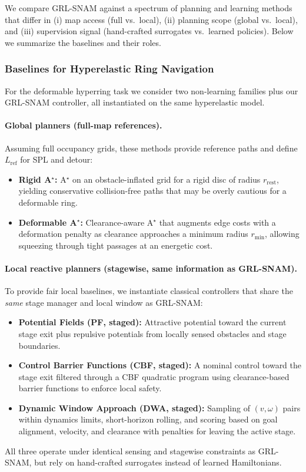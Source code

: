 \documentclass{article} %
\begin{document}
We compare GRL-SNAM against a spectrum of planning and learning methods that differ in (i) map access (full vs.\ local), (ii) planning scope (global vs.\ local), and (iii) supervision signal (hand-crafted surrogates vs.\ learned policies). Below we summarize the baselines and their roles.

\subsubsection{Baselines for Hyperelastic Ring Navigation}
\label{subsubsec:baselines_ring}

For the deformable hyperring task we consider two non-learning families plus our GRL-SNAM controller, all instantiated on the same hyperelastic model.

\paragraph{Global planners (full-map references).}
Assuming full occupancy grids, these methods provide reference paths and define $L_{\mathrm{ref}}$ for SPL and detour:
\begin{itemize}
    \item \textbf{Rigid A$^{\star}$:} A$^{\star}$ on an obstacle-inflated grid for a rigid disc of radius $r_{\text{rest}}$, yielding conservative collision-free paths that may be overly cautious for a deformable ring.
    \item \textbf{Deformable A$^{\star}$:} Clearance-aware A$^{\star}$ that augments edge costs with a deformation penalty as clearance approaches a minimum radius $r_{\min}$, allowing squeezing through tight passages at an energetic cost.
\end{itemize}

\paragraph{Local reactive planners (stagewise, same information as GRL-SNAM).}
To provide fair local baselines, we instantiate classical controllers that share the \emph{same} stage manager and local window as GRL-SNAM:
\begin{itemize}
    \item \textbf{Potential Fields (PF, staged):} Attractive potential toward the current stage exit plus repulsive potentials from locally sensed obstacles and stage boundaries.
    \item \textbf{Control Barrier Functions (CBF, staged):} A nominal control toward the stage exit filtered through a CBF quadratic program using clearance-based barrier functions to enforce local safety.
    \item \textbf{Dynamic Window Approach (DWA, staged):} Sampling of $(v,\omega)$ pairs within dynamics limits, short-horizon rolling, and scoring based on goal alignment, velocity, and clearance with penalties for leaving the active stage.
\end{itemize}
All three operate under identical sensing and stagewise constraints as GRL-SNAM, but rely on hand-crafted surrogates instead of learned Hamiltonians.
\end{document}
